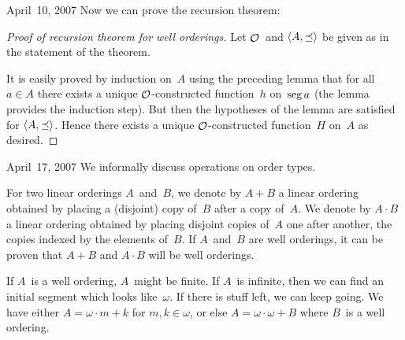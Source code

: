 \begin{lecture}{April~10, 2007}
\noindent Now we can prove the recursion theorem:
\begin{proof}[Proof of recursion theorem for well orderings]
Let \(\mathop{\mathcal{O}}\nolimits\)~and \(\langle{A},{\preceq}\rangle\) be given as in the statement of the theorem.

It is easily proved by induction on~\(A\) using the preceding lemma that for all \(a\in A\) there exists a unique \(\mathop{\mathcal{O}}\nolimits\)-constructed function~\(h\) on~\(\operatorname{seg} a\) (the lemma provides the induction step). But then the hypotheses of the lemma are satisfied for \(\langle{A},{\preceq}\rangle\). Hence there exists a unique \(\mathop{\mathcal{O}}\nolimits\)-constructed function~\(H\) on~\(A\) as desired.
\end{proof}
\end{lecture}

\begin{lecture}{April~17, 2007}
We informally discuss operations on order types.

For two linear orderings \(A\)~and~\(B\), we denote by \(A+B\) a linear ordering obtained by placing a (disjoint) copy of~\(B\) after a copy of~\(A\). We denote by \(A\cdot B\) a linear ordering obtained by placing disjoint copies of~\(A\) one after another, the copies indexed by the elements of~\(B\). If \(A\)~and~\(B\) are well orderings, it can be proven that \(A+B\) and \(A\cdot B\) will be well orderings.

If \(A\)~is a well ordering, \(A\)~might be finite. If \(A\)~is infinite, then we can find an initial segment which looks like~\(\omega\). If there is stuff left, we can keep going. We have either \(A=\omega\cdot m+k\) for \(m,k\in\omega\), or else \(A=\omega\cdot\omega+B\) where \(B\)~is a well ordering.


\end{lecture}
